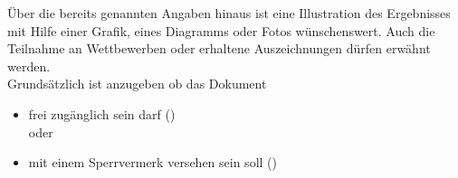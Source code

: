 \renewcommand*{\authorOfNextLines}{HTL Weiz}
Über die bereits genannten Angaben hinaus ist eine Illustration des Ergebnisses mit Hilfe einer Grafik, eines Diagramms oder Fotos wünschenswert.
Auch die Teilnahme an Wettbewerben oder erhaltene Auszeichnungen dürfen erwähnt werden.\\
Grundsätzlich ist anzugeben ob das Dokument 
\begin{itemize}
	\item frei zugänglich sein darf ()\\
		oder
	\item mit einem Sperrvermerk versehen sein soll ()
	
\end{itemize}